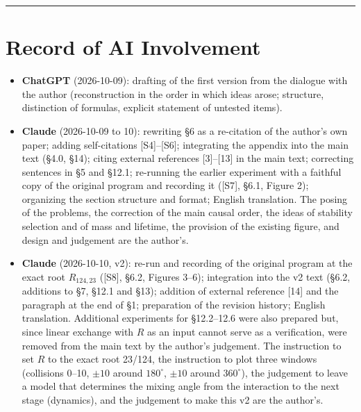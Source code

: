 \documentclass[
  a4paper,
]{article}
\providecommand{\tightlist}{%
  \setlength{\itemsep}{0pt}\setlength{\parskip}{0pt}}
\begin{document}
\begin{center}\rule{0.5\linewidth}{0.5pt}\end{center}

\section{Record of AI Involvement}\label{record-of-ai-involvement}

\begin{itemize}
\tightlist
\item
  \textbf{ChatGPT} (2026-10-09): drafting of the first version from the
  dialogue with the author (reconstruction in the order in which ideas
  arose; structure, distinction of formulas, explicit statement of
  untested items).
\item
  \textbf{Claude} (2026-10-09 to 10): rewriting §6 as a re-citation of
  the author's own paper; adding self-citations {[}S4{]}--{[}S6{]};
  integrating the appendix into the main text (§4.0, §14); citing
  external references {[}3{]}--{[}13{]} in the main text; correcting
  sentences in §5 and §12.1; re-running the earlier experiment with a
  faithful copy of the original program and recording it ({[}S7{]},
  §6.1, Figure 2); organizing the section structure and format; English
  translation. The posing of the problems, the correction of the main
  causal order, the ideas of stability selection and of mass and
  lifetime, the provision of the existing figure, and design and
  judgement are the author's.
\item
  \textbf{Claude} (2026-10-10, v2): re-run and recording of the original
  program at the exact root \(R_{124,23}\) ({[}S8{]}, §6.2, Figures
  3--6); integration into the v2 text (§6.2, additions to §7, §12.1 and
  §13); addition of external reference {[}14{]} and the paragraph at the
  end of §1; preparation of the revision history; English translation.
  Additional experiments for §12.2--12.6 were also prepared but, since
  linear exchange with \(R\) as an input cannot serve as a verification,
  were removed from the main text by the author's judgement. The
  instruction to set \(R\) to the exact root 23/124, the instruction to
  plot three windows (collisions 0--10, \(\pm10\) around \(180^\circ\),
  \(\pm10\) around \(360^\circ\)), the judgement to leave a model that
  determines the mixing angle from the interaction to the next stage
  (dynamics), and the judgement to make this v2 are the author's.
\end{itemize}
\end{document}
